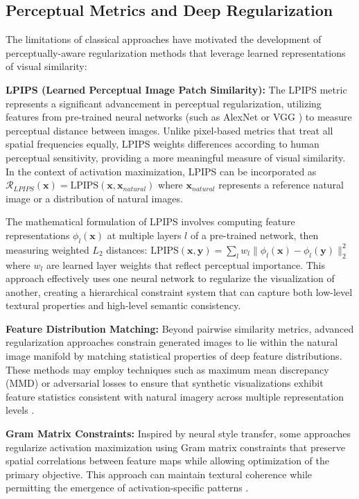 \subsection{Perceptual Metrics and Deep Regularization}

The limitations of classical approaches have motivated the development of perceptually-aware regularization methods that leverage learned representations of visual similarity:

\textbf{LPIPS (Learned Perceptual Image Patch Similarity):} The LPIPS metric \citep{zhang2018perceptual} represents a significant advancement in perceptual regularization, utilizing features from pre-trained neural networks (such as AlexNet or VGG \citep{krizhevsky2012imagenet,simonyan2014very}) to measure perceptual distance between images. Unlike pixel-based metrics that treat all spatial frequencies equally, LPIPS weights differences according to human perceptual sensitivity, providing a more meaningful measure of visual similarity. In the context of activation maximization, LPIPS can be incorporated as $\mathcal{R}_{LPIPS}(\mathbf{x}) = \text{LPIPS}(\mathbf{x}, \mathbf{x}_{natural})$ where $\mathbf{x}_{natural}$ represents a reference natural image or a distribution of natural images.

The mathematical formulation of LPIPS involves computing feature representations $\phi_l(\mathbf{x})$ at multiple layers $l$ of a pre-trained network, then measuring weighted $L_2$ distances: $\text{LPIPS}(\mathbf{x}, \mathbf{y}) = \sum_l w_l \|\phi_l(\mathbf{x}) - \phi_l(\mathbf{y})\|_2^2$ where $w_l$ are learned layer weights that reflect perceptual importance. This approach effectively uses one neural network to regularize the visualization of another, creating a hierarchical constraint system that can capture both low-level textural properties and high-level semantic consistency.

\textbf{Feature Distribution Matching:} Beyond pairwise similarity metrics, advanced regularization approaches constrain generated images to lie within the natural image manifold by matching statistical properties of deep feature distributions. These methods may employ techniques such as maximum mean discrepancy (MMD) or adversarial losses to ensure that synthetic visualizations exhibit feature statistics consistent with natural imagery across multiple representation levels \citep{goodfellow2014generative, dziugaite2015traininggenerativeneuralnetworks}.

\textbf{Gram Matrix Constraints:} Inspired by neural style transfer, some approaches regularize activation maximization using Gram matrix constraints that preserve spatial correlations between feature maps while allowing optimization of the primary objective. This approach can maintain textural coherence while permitting the emergence of activation-specific patterns \citep{gatys2016image}.

